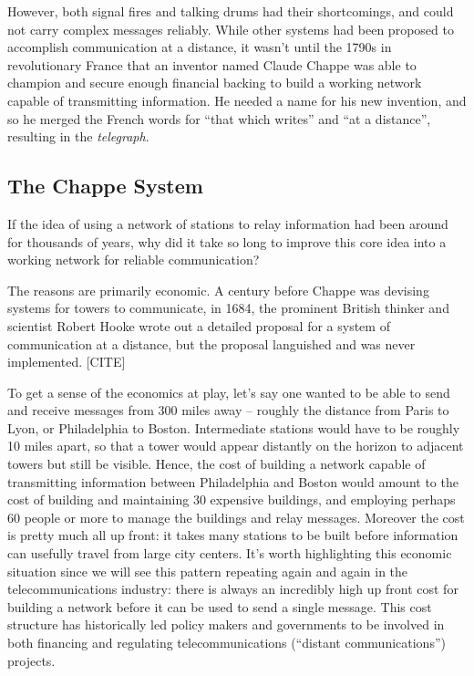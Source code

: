 \documentclass[UTF8]{book}
\begin{document}
\begin{CJK}{UTF8}{gbsn}
However, both signal fires and talking drums had their shortcomings, and could not carry complex messages reliably. While other systems had been proposed to accomplish communication at a distance, it wasn't until the 1790s in revolutionary France that an inventor named Claude Chappe was able to champion and secure enough financial backing to build a working network capable of transmitting information. He needed a name for his new invention, and so he merged the French words for ``that which writes'' and ``at a distance'', resulting in the \emph{telegraph}.

\subsection{The Chappe System}

If the idea of using a network of stations to relay information had been around for thousands of years, why did it take so long to improve this core idea into a working network for reliable communication?

The reasons are primarily economic. A century before Chappe was devising systems for towers to communicate, in 1684, the prominent British thinker and scientist Robert Hooke wrote out a detailed proposal for a system of communication at a distance, but the proposal languished and was never implemented. [CITE]

To get a sense of the economics at play, let's say one wanted to be able to send and receive messages from 300 miles away -- roughly the distance from Paris to Lyon, or Philadelphia to Boston. Intermediate stations would have to be roughly 10 miles apart, so that a tower would appear distantly on the horizon to adjacent towers but still be visible. Hence, the cost of building a network capable of transmitting information between Philadelphia and Boston would amount to the cost of building and maintaining 30 expensive buildings, and employing perhaps 60 people or more to manage the buildings and relay messages. Moreover the cost is pretty much all up front: it takes many stations to be built before information can usefully travel from large city centers. It's worth highlighting this economic situation since we will see this pattern repeating again and again in the telecommunications industry: there is always an incredibly high up front cost for building a network before it can be used to send a single message. This cost structure has historically led policy makers and governments to be involved in both financing and regulating telecommunications (``distant communications'') projects.


\end{CJK}
\end{document}
